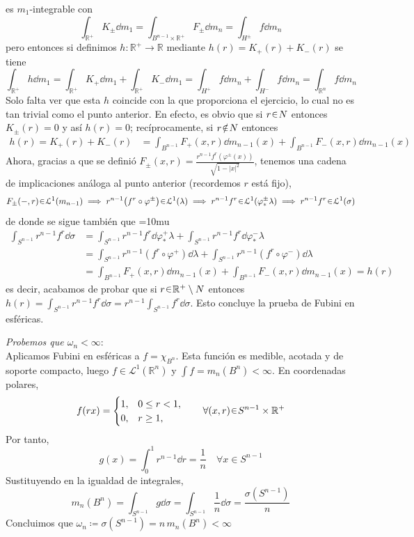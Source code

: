 \begin{sol}
\begin{itemize}
\[\]
es $m_1$-integrable con
\[
\int_{\mathbb{R}^+} K_\pm \dd{m_1}
= \int_{B^{n-1}\times\mathbb{R^+}} F_\pm \dd{m_n}
= \int_{H^\pm} f \dd{m_n}
\]
pero entonces si definimos $h \colon \mathbb{R}^+ \to \mathbb{R}$ mediante $h(r) = K_+(r) + K_-(r)$ se tiene
\[
\int_{\mathbb{R}^+} h \dd{m_1}
= \int_{\mathbb{R}^+} K_+ \dd{m_1} + \int_{\mathbb{R}^+} K_- \dd{m_1}
= \int_{H^+} f \dd{m_n} + \int_{H^-} f \dd{m_n}
= \int_{\mathbb{R}^n} f \dd{m_n}
\]
Solo falta ver que esta $h$ coincide con la que proporciona el ejercicio, lo cual no es tan trivial como el punto anterior. En efecto, es obvio que si $r\en N$ entonces $K_\pm(r) = 0$ y así $h(r) = 0$; recíprocamente, si $r\noten N$ entonces 
\begin{align*}
h(r)
= K_+(r) + K_-(r)
&= \int_{B^{n-1}}F_+(x,r)\dd{m_{n-1}(x)} + \int_{B^{n-1}}F_-(x,r)\dd{m_{n-1}(x)}
\end{align*}
Ahora, gracias a que se definió $F_\pm(x,r) = \frac{r^{n-1}f^r(\varphi^\pm(x))}{\sqrt{1-|x|^2}}$, tenemos una cadena de implicaciones análoga al punto anterior (recordemos $r$ está fijo), 
\[
F_\pm(-,r) \en \mathcal{L}^1(m_{n-1})
\implies
r^{n-1}\bigl(f^r\circ\varphi^\pm\bigr)\en \mathcal{L}^1(\lambda)
\implies
r^{n-1}f^r\en \mathcal{L}^1(\varphi^\pm_*\lambda)
\implies
r^{n-1}f^r\en \mathcal{L}^1(\sigma)
\]
de donde se sigue también que
{\thickmuskip=10mu
\begin{align*}
\int_{S^{n-1}} r^{n-1}f^r \dd{\sigma}
&= \int_{S^{n-1}} r^{n-1}f^r \dd{\varphi^+_*\lambda} + \int_{S^{n-1}} r^{n-1}f^r \dd{\varphi^-_*\lambda}\\
&= \int_{S^{n-1}} r^{n-1}(f^r\circ\varphi^+) \dd{\lambda} + \int_{S^{n-1}} r^{n-1}(f^r\circ\varphi^-) \dd{\lambda}\\
&= \int_{B^{n-1}}F_+(x,r)\dd{m_{n-1}(x)} + \int_{B^{n-1}}F_-(x,r)\dd{m_{n-1}(x)}
= h(r)
\end{align*}}
es decir, acabamos de probar que si $r\en\mathbb{R}^+\setminus N$ entonces $h(r) = \int_{S^{n-1}} r^{n-1}f^r \dd{\sigma} = r^{n-1}\int_{S^{n-1}} f^r \dd{\sigma}$. Esto concluye la prueba de Fubini en esféricas.
\end{itemize}


\vspace{1em}
\noindent\emph{Probemos que \(\omega_n<\infty\)}:\\ 
Aplicamos Fubini en esféricas a \(f = \chi_{B^n}\). Esta función es medible, acotada y de soporte compacto, luego \(f\in \mathcal{L}^1(\mathbb{R}^n)\) y \(\int f = m_n(B^n)<\infty\). En coordenadas polares,
\[
f(rx) = \begin{cases}
1, & 0\le r<1,\\
0, & r\ge 1,
\end{cases}\qquad \forall(x,r)\en S^{n-1}\times\mathbb{R}^+
\]
Por tanto,
\[
g(x) = \int_0^1 r^{n-1}\dd{r} = \frac{1}{n}\quad \forall x\in S^{n-1}
\]
Sustituyendo en la igualdad de integrales,
\[
m_n(B^n) = \int_{S^{n-1}} g\dd{\sigma} = \int_{S^{n-1}} \frac{1}{n}\dd{\sigma} = \frac{\sigma(S^{n-1})}{n}
\]
Concluimos que \(\omega_n \coloneqq \sigma(S^{n-1}) = n\,m_n(B^n) < \infty\)
\end{sol}